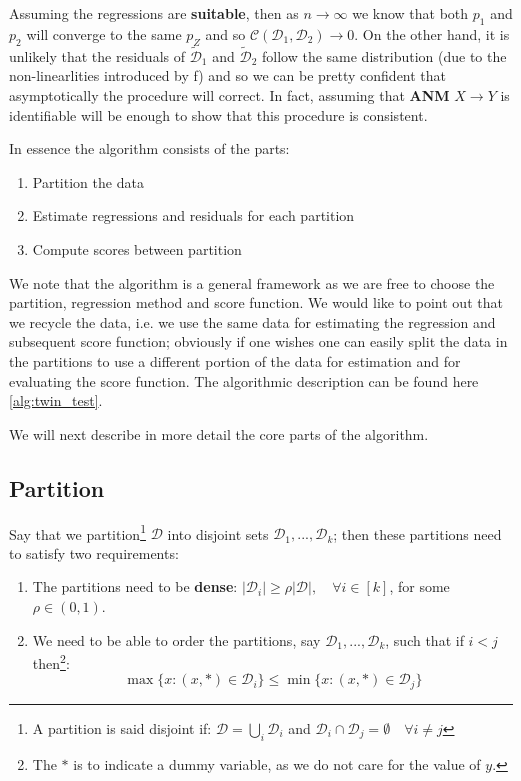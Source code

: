 Assuming the regressions are \textbf{suitable}, then as $n \rightarrow \infty$ we know that both 
$p_1$ and $p_2$ will converge to the same $p_Z$ and so $\mathcal{C}(\mathcal{D}_1, \mathcal{D}_2) \rightarrow 0$.
On the other hand, it is unlikely that the residuals of $\mathcal{\tilde{D}}_1$ and $\mathcal{\tilde{D}}_2$ 
follow the same distribution (due to the non-linearlities introduced by f) and 
so we can be pretty confident that asymptotically the procedure will correct. In fact, assuming that \textbf{ANM}
$X \rightarrow Y$ is identifiable will be enough to show that this procedure is consistent.

In essence the algorithm consists of the parts:

\begin{enumerate}
    \item Partition the data
    \item Estimate regressions and residuals for each partition
    \item Compute scores between partition
\end{enumerate}

We note that the algorithm is a general framework as we are free to choose the partition, regression method
and score function. We would like to point out that we recycle the data, i.e. we use the same data for 
estimating the regression and subsequent score function; obviously if one wishes one can easily split the 
data in the partitions to use a different portion of the data for estimation and for evaluating the score function.
The algorithmic description can be found here \ref{alg:twin_test}.

We will next describe in more detail the core parts of the algorithm.

\subsection{Partition}

Say that we partition\footnote{
    A partition is said disjoint if:
    $\mathcal{D} = \bigcup_i \mathcal{D}_i $ and $\mathcal{D}_i \cap \mathcal{D}_j = \emptyset \quad \forall i \neq j$}
$\mathcal{D}$ into disjoint sets $\mathcal{D}_1, ..., \mathcal{D}_k$; then these 
partitions need to satisfy two requirements:

\begin{enumerate}
    \item The partitions need to be \textbf{dense}: 
    $|\mathcal{D}_i| \geq \rho |\mathcal{D}|, \quad \forall i \in [k]$, for some $\rho \in (0, 1)$.
    \item We need to be able to order the partitions, say $\mathcal{D}_1, ..., \mathcal{D}_k$, such that
    if $i < j$ then\footnote{The $*$ is to indicate a dummy variable, as we do not care for the value of $y$.}: 
    $$
    \operatorname{max} \{ x : (x, *) \in \mathcal{D}_i \} \leq 
    \operatorname{min} \{ x : (x, *) \in \mathcal{D}_j \}
    $$
\end{enumerate}


